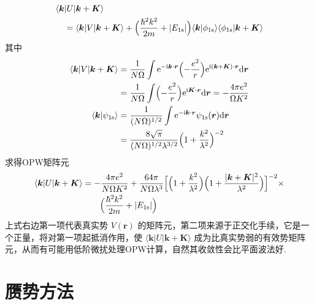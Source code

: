 \begin{equation}
\begin{aligned}
  &\langle\boldsymbol{k}|U|\boldsymbol{k}+\boldsymbol{K}\rangle\\
  &\quad=\langle\boldsymbol{k}|V|\boldsymbol{k}+\boldsymbol{K}\rangle
  +\Bigl(\frac{\hbar^{2}k^{2}}{2m}+|E_{1\mathrm{s}}|\Bigr)
  \langle\boldsymbol{k}|\phi_{1\mathrm{s}}\rangle\langle\phi_{1\mathrm{s}}|\boldsymbol{k}+\boldsymbol{K}\rangle
\end{aligned}
\end{equation}
其中
\begin{equation*}
\begin{aligned}
  \langle\boldsymbol{k}|V|\boldsymbol{k}+\boldsymbol{K}\rangle
  &=\frac{1}{N\Omega}\int\mathrm{e}^{-\mathrm{i}\boldsymbol{k}\cdot\boldsymbol{r}}\Bigl(-\frac{e^{2}}{r}\Bigr)\mathrm{e}^{\mathrm{i}(\boldsymbol{k}+\boldsymbol{K})\cdot\boldsymbol{r}}\mathrm{d}\boldsymbol{r}\\
  &=\frac{1}{N\Omega}\int\Bigl(-\frac{e^{2}}{r}\Bigr)\mathrm{e}^{\mathrm{i}\boldsymbol{K}\cdot\boldsymbol{r}}\mathrm{d}\boldsymbol{r}
  =-\frac{4\pi e^{2}}{\Omega K^{2}}\\
  \langle\boldsymbol{k}|\psi_{1\mathrm{s}}\rangle
  &=\frac{1}{(N\Omega)^{1/2}}\int\mathrm{e}^{-\mathrm{i}\boldsymbol{k}\cdot\boldsymbol{r}}\psi_{1\mathrm{s}}(\boldsymbol{r})\mathrm{d}\boldsymbol{r}\\
  &=\frac{8\sqrt{\pi}}{(N\Omega)^{1/2}\lambda^{3/2}}\Bigl(1+\frac{k^{2}}{\lambda^{2}}\Bigr)^{-2}
\end{aligned}
\end{equation*}
求得OPW矩阵元
\begin{equation}
\begin{aligned}
  \langle\boldsymbol{k}|U|\boldsymbol{k}+\boldsymbol{K}\rangle
  &=-\frac{4\pi e^{2}}{N\Omega K^{2}}
  +\frac{64\pi}{N\Omega\lambda^{3}}
  \Bigl[\Bigl(1+\frac{k^{2}}{\lambda^{2}}\Bigr)
  \Bigl(1+\frac{|\boldsymbol{k}+\boldsymbol{K}|^{2}}{\lambda^{2}}\Bigr)\Bigr]^{-2}\times\\
  &\qquad\Bigl(\frac{\hbar^{2}k^{2}}{2m}+|E_{1\mathrm{s}}|\Bigr)
\end{aligned}
\end{equation}
上式右边第一项代表真实势 $V(\boldsymbol{r})$ 的矩阵元，第二项来源于正交化手续，它是一个正量，将对第一项起抵消作用，使 $\langle\boldsymbol{k}|U|\boldsymbol{k}+\boldsymbol{K}\rangle$ 成为比真实势弱的有效势矩阵元，从而有可能用低阶微扰处理OPW计算，自然其收敛性会比平面波法好.

\section{赝势方法}

